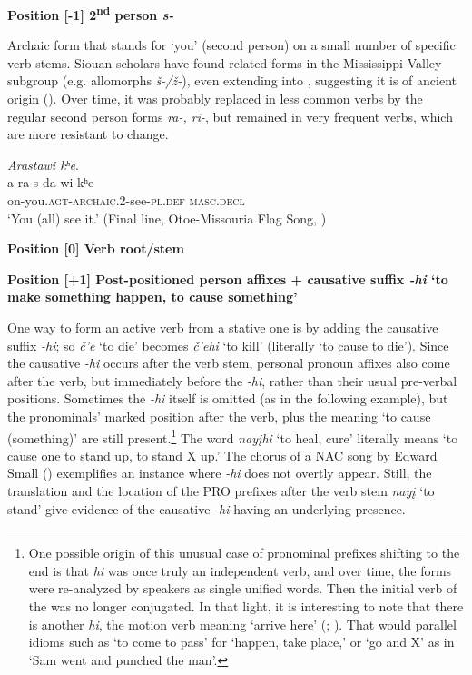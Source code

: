 \documentclass[output=paper]{LSP/langsci}
\begin{document}
\vspace{1em}
\textbf{Position [-1]  2\textsuperscript{nd} person \textit{s-} }

Archaic form that stands for `you' (second person) on a small number of specific verb stems.  Siouan scholars have found related forms in the Mississippi Valley subgroup (e.g.  allomorphs \textit{\v{s}-/\v{z}-}), even extending into , suggesting it is of ancient origin (\citealt[479-480]{Rankin2005b}).  Over time, it was probably replaced in less common verbs by the regular second person forms \textit{ra-, ri-}, but remained in very frequent verbs, which are more resistant to change.        

\begin{exe}
\ex 
\glll \textit{Arastawi kʰe}.\\
 a-ra-s-da-wi  kʰe  \\
on-you.\textsc{agt-archaic}.2-see-\textsc{pl.def} \textsc{masc.decl} \\
\trans `You (all) see it.'  (Final line, Otoe-Missouria Flag Song, \citealt{Greer2008})     
\end{exe}     
					 
\textbf{Position [0]  Verb root/stem}

\vspace{1em}
\textbf{Position [+1] Post-positioned person affixes + causative suffix  \textit{-hi} `to make something happen, to cause something'}

One way to form an active verb from a stative one is by adding the causative suffix \textit{-hi}; so \textit{\v{c}'e} `to die' becomes \textit{\v{c}'ehi} `to kill' (literally `to cause to die'). Since the causative \textit{-hi} occurs after the verb stem, personal pronoun affixes also come after the verb, but immediately before the \textit{-hi}, rather than their usual pre-verbal positions.  Sometimes the \textit{-hi} itself is omitted (as in the following example), but the pronominals' marked position after the verb, plus the meaning `to cause (something)' are still present.\footnote{One possible origin of this unusual case of pronominal prefixes shifting to the end is that \textit{hi} was once truly an independent verb, and over time, the forms were re-analyzed by speakers as single unified words. Then the initial verb of the  was no longer conjugated. In that light, it is interesting to note that there is another \textit{hi}, the motion verb meaning `arrive here' (\citealt{Taylor1976a}; \citealt{Hopkins1988}). That would parallel  idioms such as `to come to pass' for `happen, take place,' or `go and X' as in `Sam went and punched the man'.}  The word \textit{nay\k{i}hi}  `to heal, cure' literally means `to cause one to stand up, to stand X up.'  The chorus of a NAC song by Edward Small () exemplifies an instance where  \textit{-hi} does not overtly appear.  Still, the translation and the location of the PRO prefixes after the verb stem \textit{nay\k{i}} `to stand' give evidence of the causative \textit{-hi} having an underlying presence.
\end{document}

